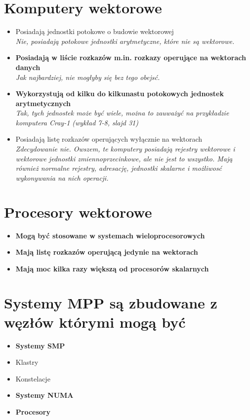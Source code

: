\documentclass[a4paper,twoside]{article}
\begin{document}
\section{Komputery wektorowe}
	\begin{itemize}
    \item Posiadają jednostki potokowe o budowie wektorowej\\
    {\small \emph{Nie, posiadają potokowe jednostki arytmetyczne, które nie są wektorowe.}}
    \item \textbf{Posiadają w liście rozkazów m.in. rozkazy operujące na wektorach danych}\\
    {\small \emph{Jak najbardziej, nie mogłyby się bez tego obejsć.}}
    \item \textbf{Wykorzystują od kilku do kilkunastu potokowych jednostek arytmetycznych}\\
    {\small \emph{Tak, tych jednostek może być wiele, można to zauważyć na przykładzie komputera Cray-1 (wykład 7-8, slajd 31)}}
    \item Posiadają listę rozkazów operujących wyłącznie na wektorach\\
    {\small \emph{Zdecydowanie nie. Owszem, te komputery posiadają rejestry wektorowe i wektorowe jednostki zmiennoprzecinkowe, ale nie jest to wszystko. Mają również normalne rejestry, adresację, jednostki skalarne i możliwosć wykonywania na nich operacji.}}
    \end{itemize}

\section{Procesory wektorowe}
	\begin{itemize}
    \item \textbf{Mogą być stosowane w systemach wieloprocesorowych}
    \item \textbf{Mają listę rozkazów operującą jedynie na wektorach}
    \item \textbf{Mają moc kilka razy większą od procesorów skalarnych}
    \end{itemize}

\section{Systemy MPP są zbudowane z węzłów którymi mogą być}
	\begin{itemize}
    \item \textbf{Systemy SMP}
    \item Klastry
    \item Konstelacje
    \item \textbf{Systemy NUMA}
    \item \textbf{Procesory}
    \end{itemize}
\end{document}
